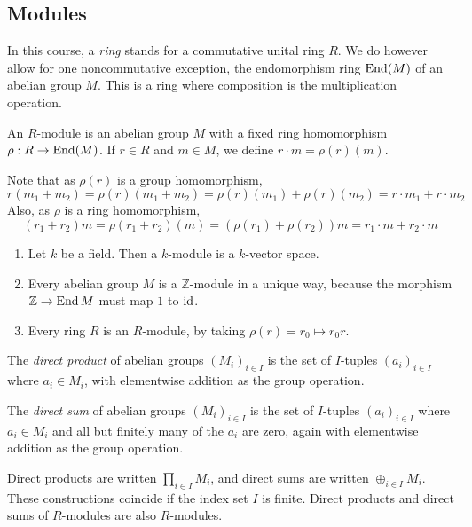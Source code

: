 \subsection{Modules}
In this course, a \emph{ring} stands for a commutative unital ring \( R \).
We do however allow for one noncommutative exception, the endomorphism ring \( \operatorname{End}(M) \) of an abelian group \( M \).
This is a ring where composition is the multiplication operation.
\begin{definition}
    An \( R \)-module is an abelian group \( M \) with a fixed ring homomorphism \( \rho : R \to \operatorname{End}(M) \).
    If \( r \in R \) and \( m \in M \), we define \( r \cdot m = \rho(r)(m) \).
\end{definition}
\begin{remark}
    Note that as \( \rho(r) \) is a group homomorphism,
    \[ r(m_1 + m_2) = \rho(r)(m_1 + m_2) = \rho(r)(m_1) + \rho(r)(m_2) = r \cdot m_1 + r \cdot m_2 \]
    Also, as \( \rho \) is a ring homomorphism,
    \[ (r_1 + r_2)m = \rho(r_1 + r_2)(m) = (\rho(r_1) + \rho(r_2))m = r_1 \cdot m + r_2 \cdot m \]
\end{remark}
\begin{example}
    \begin{enumerate}
        \item Let \( k \) be a field.
        Then a \( k \)-module is a \( k \)-vector space.
        \item Every abelian group \( M \) is a \( \mathbb Z \)-module in a unique way, because the morphism \( \mathbb Z \to \operatorname{End} M \) must map \( 1 \) to \( \operatorname{id} \).
        \item Every ring \( R \) is an \( R \)-module, by taking \( \rho(r) = r_0 \mapsto r_0 r \).
    \end{enumerate}
\end{example}
\begin{definition}
    The \emph{direct product} of abelian groups \( (M_i)_{i \in I} \) is the set of \( I \)-tuples \( (a_i)_{i \in I} \) where \( a_i \in M_i \), with elementwise addition as the group operation.
\end{definition}
\begin{definition}
    The \emph{direct sum} of abelian groups \( (M_i)_{i \in I} \) is the set of \( I \)-tuples \( (a_i)_{i \in I} \) where \( a_i \in M_i \) and all but finitely many of the \( a_i \) are zero, again with elementwise addition as the group operation.
\end{definition}
Direct products are written \( \prod_{i \in I} M_i \), and direct sums are written \( \oplus_{i \in I} M_i \).
These constructions coincide if the index set \( I \) is finite.
Direct products and direct sums of \( R \)-modules are also \( R \)-modules.

